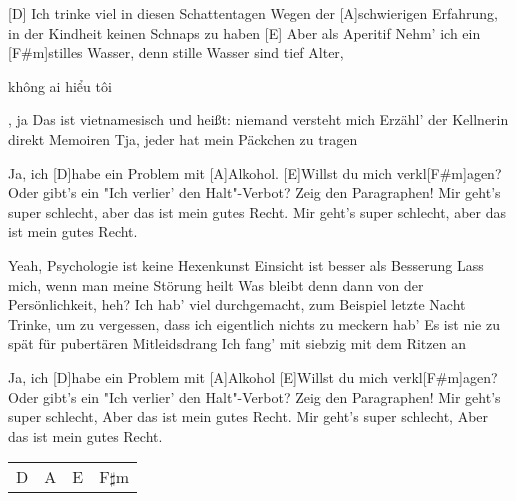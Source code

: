 



\begin{guitar}
	[D] Ich trinke viel in diesen Schattentagen
	Wegen der [A]schwierigen Erfahrung, in der Kindheit keinen Schnaps zu haben
	[E] Aber als Aperitif
	Nehm' ich ein [F#m]stilles Wasser, denn stille Wasser sind tief
	Alter, \begin{otherlanguage}{vietnamese}không ai hiểu tôi\end{otherlanguage}, ja
	Das ist vietnamesisch und heißt: niemand versteht mich
	Erzähl' der Kellnerin direkt Memoiren
	Tja, jeder hat mein Päckchen zu tragen
	
	\begin{highlightbar}
		Ja, ich [D]habe ein Problem mit [A]Alkohol. [E]Willst du mich verkl[F#m]agen?
		Oder gibt's ein "Ich verlier' den Halt"\--Verbot? Zeig den Paragraphen!
		Mir geht's super schlecht, aber das ist mein gutes Recht.
		Mir geht's super schlecht, aber das ist mein gutes Recht.
	\end{highlightbar}
	
	\songsection{Strophe 2}
	Yeah, Psychologie ist keine Hexenkunst
	Einsicht ist besser als Besserung
	Lass mich, wenn man meine Störung heilt
	Was bleibt denn dann von der Persönlichkeit, heh?
	Ich hab' viel durchgemacht, zum Beispiel letzte Nacht
	Trinke, um zu vergessen, dass ich eigentlich nichts zu meckern hab'
	Es ist nie zu spät für pubertären Mitleidsdrang
	Ich fang' mit siebzig mit dem Ritzen an
	
	\begin{highlightbar}
		\songsection{Refrain}
		Ja, ich [D]habe ein Problem mit [A]Alkohol
		[E]Willst du mich verkl[F#m]agen?
		Oder gibt's ein "Ich verlier' den Halt"\--Verbot?
		Zeig den Paragraphen!
		Mir geht's super schlecht,
		Aber das ist mein gutes Recht.
		Mir geht's super schlecht,
		Aber das ist mein gutes Recht.
	\end{highlightbar}
	
	 {\footnotesize\begin{tabular}{|l|l|l|l|}
			D & A & E & F$\sharp$m
	\end{tabular}}
	

\end{guitar}
